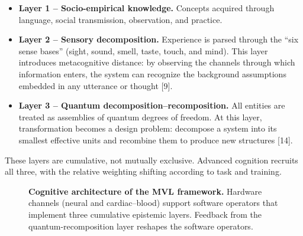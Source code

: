 \documentclass[11pt,a4paper]{article}
\begin{document}
\begin{itemize}
  \item \textbf{Layer 1 -- Socio-empirical knowledge.} Concepts acquired through language, social transmission, observation, and practice.
  \item \textbf{Layer 2 -- Sensory decomposition.} Experience is parsed through the ``six sense bases'' (sight, sound, smell, taste, touch, and mind). This layer introduces metacognitive distance: by observing the channels through which information enters, the system can recognize the background assumptions embedded in any utterance or thought [9].
  \item \textbf{Layer 3 -- Quantum decomposition--recomposition.} All entities are treated as assemblies of quantum degrees of freedom. At this layer, transformation becomes a design problem: decompose a system into its smallest effective units and recombine them to produce new structures [14].
\end{itemize}

These layers are cumulative, not mutually exclusive. Advanced cognition recruits all three, with the relative weighting shifting according to task and training.

\begin{figure}[htbp]
\centering
{}
\caption{\textbf{Cognitive architecture of the MVL framework.} Hardware channels (neural and cardiac--blood) support software operators that implement three cumulative epistemic layers. Feedback from the quantum-recomposition layer reshapes the software operators.}
\label{fig:architecture}
\end{figure}
\end{document}
